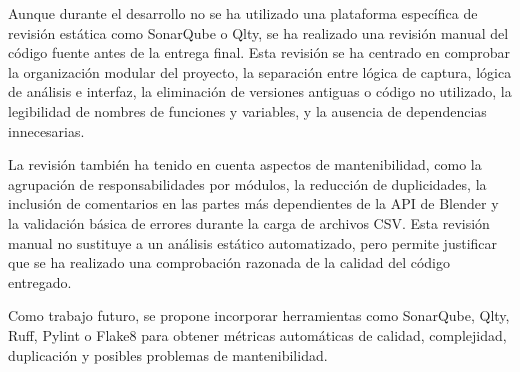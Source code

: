 Aunque durante el desarrollo no se ha utilizado una plataforma específica de revisión estática como SonarQube o Qlty, se ha realizado una revisión manual del código fuente antes de la entrega final. Esta revisión se ha centrado en comprobar la organización modular del proyecto, la separación entre lógica de captura, lógica de análisis e interfaz, la eliminación de versiones antiguas o código no utilizado, la legibilidad de nombres de funciones y variables, y la ausencia de dependencias innecesarias.

La revisión también ha tenido en cuenta aspectos de mantenibilidad, como la agrupación de responsabilidades por módulos, la reducción de duplicidades, la inclusión de comentarios en las partes más dependientes de la API de Blender y la validación básica de errores durante la carga de archivos CSV. Esta revisión manual no sustituye a un análisis estático automatizado, pero permite justificar que se ha realizado una comprobación razonada de la calidad del código entregado.

Como trabajo futuro, se propone incorporar herramientas como SonarQube, Qlty, Ruff, Pylint o Flake8 para obtener métricas automáticas de calidad, complejidad, duplicación y posibles problemas de mantenibilidad.

